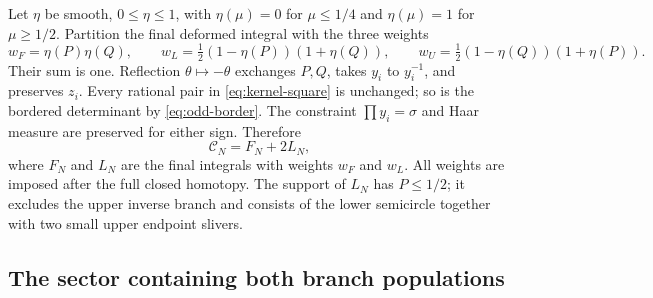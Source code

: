 \documentclass[11pt]{article}
\numberwithin{equation}{section}
\theoremstyle{remark}\newtheorem{remark}[theorem]{Remark}
\begin{document}
Let $\eta$ be smooth, $0\le\eta\le1$, with $\eta(\mu)=0$ for
$\mu\le1/4$ and $\eta(\mu)=1$ for $\mu\ge1/2$.  Partition the final
deformed integral with the three weights
\[
 w_F=\eta(P)\eta(Q),\qquad
 w_L=\tfrac12(1-\eta(P))(1+\eta(Q)),\qquad
 w_U=\tfrac12(1-\eta(Q))(1+\eta(P)).
\]
Their sum is one.  Reflection $\theta\mapsto-\theta$ exchanges $P,Q$,
takes $y_i$ to $y_i^{-1}$, and preserves $z_i$.
Every rational pair in \eqref{eq:kernel-square} is unchanged;
so is the bordered determinant by \eqref{eq:odd-border}.
The constraint $\prod y_i=\sigma$ and Haar measure are preserved
for either sign. Therefore
\begin{equation}\label{eq:constrained-split}
 \mathcal C_N=F_N+2L_N,
\end{equation}
where $F_N$ and $L_N$ are the final integrals with weights $w_F$
and $w_L$.  All weights are imposed after the full closed homotopy.
The support of $L_N$ has $P\le1/2$; it excludes the upper inverse
branch and consists of the lower semicircle together with two small
upper endpoint slivers.

\subsection{The sector containing both branch populations}
\end{document}
